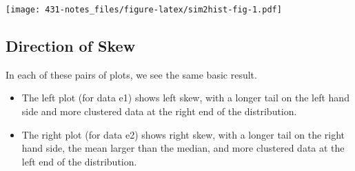 \documentclass[
]{book}
\newenvironment{Shaded}{\begin{snugshade}}{\end{snugshade}}
\newcommand{\ControlFlowTok}[1]{\textcolor[rgb]{0.13,0.29,0.53}{\textbf{#1}}}
\newcommand{\DataTypeTok}[1]{\textcolor[rgb]{0.13,0.29,0.53}{#1}}
\newcommand{\FloatTok}[1]{\textcolor[rgb]{0.00,0.00,0.81}{#1}}
\newcommand{\KeywordTok}[1]{\textcolor[rgb]{0.13,0.29,0.53}{\textbf{#1}}}
\newcommand{\NormalTok}[1]{#1}
\newcommand{\OperatorTok}[1]{\textcolor[rgb]{0.81,0.36,0.00}{\textbf{#1}}}
\newcommand{\StringTok}[1]{\textcolor[rgb]{0.31,0.60,0.02}{#1}}
\providecommand{\tightlist}{%
  \setlength{\itemsep}{0pt}\setlength{\parskip}{0pt}}
\begin{document}
\begin{Shaded}
\end{Shaded}

\texttt{[image: 431-notes\_files/figure-latex/sim2hist-fig-1.pdf]}

\hypertarget{direction-of-skew}{%
\subsection{Direction of Skew}\label{direction-of-skew}}

In each of these pairs of plots, we see the same basic result.

\begin{itemize}
\tightlist
\item
  The left plot (for data e1) shows left skew, with a longer tail on the left hand side and more clustered data at the right end of the distribution.
\item
  The right plot (for data e2) shows right skew, with a longer tail on the right hand side, the mean larger than the median, and more clustered data at the left end of the distribution.
\end{itemize}
\end{document}
